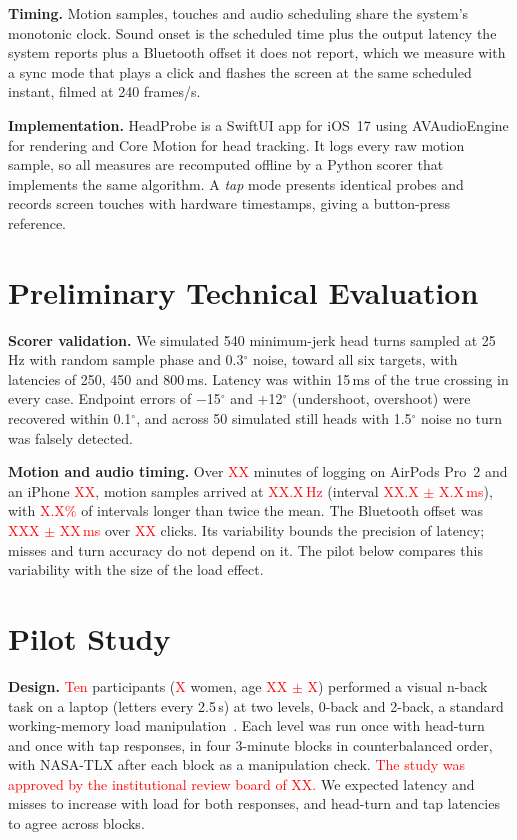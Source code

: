 \documentclass[conference,letterpaper]{IEEEtran}
\newcommand{\ph}[1]{\textcolor{red}{#1}}
\begin{document}
\textbf{Timing.} Motion samples, touches and audio scheduling share the system's monotonic clock.
Sound onset is the scheduled time plus the output latency the system reports plus a Bluetooth offset
it does not report, which we measure with a sync mode that plays a click and flashes the screen at
the same scheduled instant, filmed at 240 frames/s.

\textbf{Implementation.} HeadProbe is a SwiftUI app for iOS~17 using AVAudioEngine for rendering and
Core Motion for head tracking. It logs every raw motion sample, so all measures are recomputed offline
by a Python scorer that implements the same algorithm. A \emph{tap} mode presents identical probes and
records screen touches with hardware timestamps, giving a button-press reference.

\section{Preliminary Technical Evaluation}
\label{sec:eval}
\textbf{Scorer validation.} We simulated 540 minimum-jerk head turns sampled at 25\,Hz with random
sample phase and 0.3$^\circ$ noise, toward all six targets, with latencies of 250, 450 and 800\,ms.
Latency was within 15\,ms of the true crossing in every case. Endpoint errors of $-$15$^\circ$ and
$+$12$^\circ$ (undershoot, overshoot) were recovered within 0.1$^\circ$, and across 50 simulated still
heads with 1.5$^\circ$ noise no turn was falsely detected.

\textbf{Motion and audio timing.} Over \ph{XX} minutes of logging on AirPods Pro~2 and an iPhone
\ph{XX}, motion samples arrived at \ph{XX.X\,Hz} (interval \ph{XX.X $\pm$ X.X\,ms}), with
\ph{X.X\%} of intervals longer than twice the mean. The Bluetooth offset was \ph{XXX $\pm$ XX\,ms}
over \ph{XX} clicks. Its variability bounds the precision of latency; misses and turn accuracy do not
depend on it. The pilot below compares this variability with the size of the load effect.

\section{Pilot Study}
\label{sec:pilot}
\textbf{Design.} \ph{Ten} participants (\ph{X} women, age \ph{XX $\pm$ X}) performed a visual n-back
task on a laptop (letters every 2.5\,s) at two levels, 0-back and 2-back, a standard
working-memory load manipulation~\cite{owen2005nback}. Each level was run once with head-turn and once
with tap responses, in four 3-minute blocks in counterbalanced order, with NASA-TLX after each block as
a manipulation check. \ph{The study was approved by the institutional review board of XX.}
We expected latency and misses to increase with load for both responses, and head-turn and tap
latencies to agree across blocks.
\end{document}
